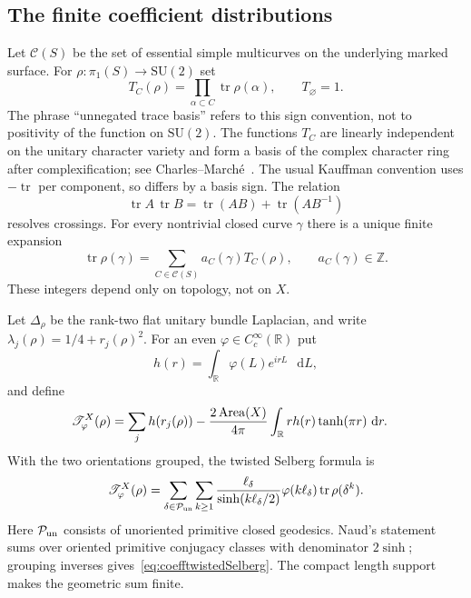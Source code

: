 \documentclass[11pt,a4paper]{article}
\numberwithin{equation}{section}
\theoremstyle{definition}
\theoremstyle{remark}
\DeclareMathOperator{\tr}{tr}
\newcommand{\dd}{\mathop{}\!\mathrm d}
\newcommand{\RR}{\mathbb R}
\newcommand{\ZZ}{\mathbb Z}
\begin{document}
\subsection{The finite coefficient distributions}

Let $\mathscr C(S)$ be the set of essential simple multicurves on
the underlying marked surface. For
$\rho:\pi_1(S)\to\mathrm{SU}(2)$ set
\begin{equation}
 T_C(\rho)=\prod_{\alpha\subset C}\tr\rho(\alpha),
 \qquad T_\varnothing=1.
 \label{eq:coeffbasis}
\end{equation}
The phrase ``unnegated trace basis'' refers to this sign convention,
not to positivity of the function on $\mathrm{SU}(2)$. The functions
$T_C$ are linearly independent on the unitary character variety and
form a basis of the complex character ring after complexification;
see Charles--March\'e~\cite{CharlesMarche}. The usual Kauffman
convention uses $-\tr$ per component, so differs by a basis sign.
The relation
\[
 \tr A\,\tr B=\tr(AB)+\tr(AB^{-1})
\]
resolves crossings. For every nontrivial closed curve $\gamma$ there
is a unique finite expansion
\begin{equation}
 \tr\rho(\gamma)=\sum_{C\in\mathscr C(S)}a_C(\gamma)T_C(\rho),
 \qquad a_C(\gamma)\in\ZZ.
 \label{eq:coeffcurveexpansion}
\end{equation}
These integers depend only on topology, not on $X$.

Let $\Delta_\rho$ be the rank-two flat unitary bundle Laplacian,
and write $\lambda_j(\rho)=1/4+r_j(\rho)^2$. For an even
$\varphi\in C_c^\infty(\RR)$ put
\[
 h(r)=\int_\RR\varphi(L)e^{irL}\,\dd L,
\]
and define
\begin{align}
 \mathscr T^X_\varphi(\rho)
 &=\sum_j h(r_j(\rho))
 -\frac{2\operatorname{Area}(X)}{4\pi}
   \int_\RR r h(r)\tanh(\pi r)\,\dd r.\notag
\end{align}
With the two orientations grouped, the twisted Selberg formula is
\begin{equation}
 \mathscr T^X_\varphi(\rho)
 =\sum_{\delta\in\mathcal P_{\rm un}}
   \sum_{k\geq1}
   \frac{\ell_\delta}{\sinh(k\ell_\delta/2)}
   \varphi(k\ell_\delta)\tr\rho(\delta^k).
 \label{eq:coefftwistedSelberg}
\end{equation}
Here $\mathcal P_{\rm un}$ consists of unoriented primitive closed
geodesics. Naud's statement~\cite[Theorem 2.2]{NaudTwisted} sums
over oriented primitive conjugacy classes with denominator
$2\sinh$; grouping inverses gives~\eqref{eq:coefftwistedSelberg}.
The compact length support makes the geometric sum finite.
\end{document}
